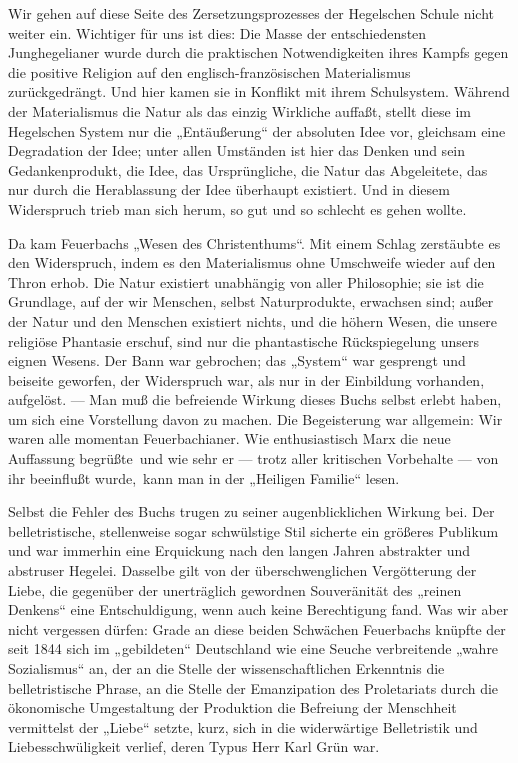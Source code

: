 Wir gehen auf diese Seite des Zersetzungsprozesses der Hegelschen
Schule nicht weiter ein. Wichtiger für uns ist dies: Die Masse der
entschiedensten Junghegelianer wurde durch die praktischen
Notwendigkeiten ihres Kampfs gegen die positive Religion auf den
englisch-französischen Materialismus zurückgedrängt. Und hier kamen sie
in Konflikt mit ihrem Schulsystem. Während der Materialismus die Natur
als das einzig Wirkliche auffaßt, stellt diese im Hegelschen System nur
die „Entäußerung`` der absoluten Idee vor, gleichsam eine Degradation der
Idee; unter allen Umständen ist hier das Denken und sein
Gedankenprodukt, die Idee, das Ursprüngliche, die Natur das Abgeleitete,
das nur durch die Herablassung der Idee überhaupt existiert. Und in
diesem Widerspruch trieb man sich herum, so gut und so schlecht es gehen
wollte.

Da kam Feuerbachs „Wesen des Christenthums``. Mit einem Schlag
zerstäubte es den Widerspruch, indem es den Materialismus ohne
Umschweife wieder auf den Thron erhob. Die Natur existiert unabhängig
von aller Philosophie; sie ist die Grundlage, auf der wir Menschen,
selbst Naturprodukte, erwachsen sind; außer der Natur und den Menschen
existiert nichts, und die höhern Wesen, die unsere religiöse Phantasie
erschuf, sind nur die phantastische Rückspiegelung unsers eignen Wesens.
Der Bann war gebrochen; das „System`` war gesprengt und beiseite
geworfen, der Widerspruch war, als nur in der Einbildung vorhanden,
aufgelöst. --- Man muß die befreiende Wirkung dieses Buchs selbst erlebt
haben, um sich eine Vorstellung davon zu machen. Die Begeisterung war
allgemein: Wir waren alle momentan Feuerbachianer. Wie enthusiastisch
Marx die neue Auffassung begrüßte \textbar{}\,und wie sehr er --- trotz aller
kritischen Vorbehalte --- von ihr beeinflußt wurde,\,\textbar{} kann man in
der „Heiligen Familie`` lesen.

Selbst die Fehler des Buchs trugen zu seiner augenblicklichen
Wirkung bei. Der belletristische, stellenweise sogar schwülstige Stil
sicherte ein größeres Publikum und war immerhin eine Erquickung nach den
langen Jahren abstrakter und abstruser Hegelei. Dasselbe gilt von der
überschwenglichen Vergötterung der Liebe, die gegenüber der unerträglich
gewordnen Souveränität des „reinen Denkens`` eine Entschuldigung, wenn
auch keine Berechtigung fand. Was wir aber nicht vergessen dürfen: Grade
an diese beiden Schwächen Feuerbachs knüpfte der seit 1844 sich im
„gebildeten`` Deutschland wie eine Seuche verbreitende „wahre
Sozialismus`` an, der an die Stelle der wissenschaftlichen Erkenntnis die
belletristische Phrase, an die Stelle der Emanzipation des Proletariats
durch die ökonomische Umgestaltung der Produktion die Befreiung der
Menschheit vermittelst der „Liebe`` setzte, kurz, sich in die
widerwärtige Belletristik und Liebesschwüligkeit verlief, deren Typus
Herr Karl Grün war.

